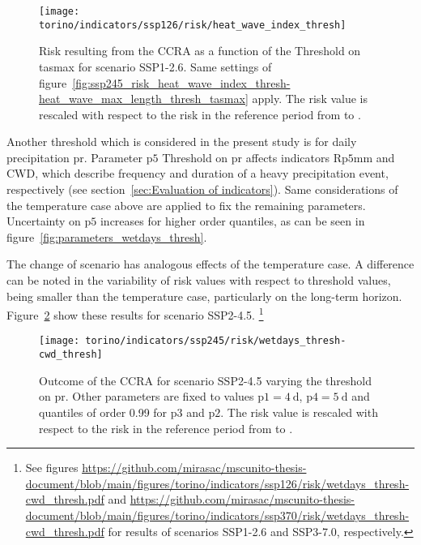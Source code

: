 \begin{figure}
  \centering
  \texttt{[image: torino/indicators/ssp126/risk/heat\_wave\_index\_thresh]}
  \caption{Risk resulting from the \gls{CCRA} as a function of the {Threshold on \gls{tasmax}} for scenario SSP1-2.6. Same settings of figure~\ref{fig:ssp245_risk_heat_wave_index_thresh-heat_wave_max_length_thresh_tasmax} apply. The risk value is rescaled with respect to the risk in the reference period from  to .}
  \label{fig:ssp126_risk_heat_wave_index_thresh-heat_wave_max_length_thresh_tasmax}
\end{figure}

Another threshold which is considered in the present study is for daily precipitation \gls{pr}. Parameter $\mathrm{p5}$ Threshold on \gls{pr} affects \glspl{indicator} $\mathrm{Rp5mm}$ and $\mathrm{CWD}$, which describe frequency and duration of a heavy precipitation event, respectively (see section~\ref{sec:Evaluation of indicators}). Same considerations of the temperature case above are applied to fix the remaining parameters. Uncertainty on $\mathrm{p5}$ increases for higher order quantiles, as can be seen in figure~\ref{fig:parameters_wetdays_thresh}.

The change of scenario has analogous effects of the temperature case. A difference can be noted in the variability of risk values with respect to threshold values, being smaller than the temperature case, particularly on the long-term horizon. Figure~\ref{fig:ssp245_risk_wetdays_thresh-cwd_thresh} show these results for scenario SSP2-4.5.%
\footnote{See figures \url{https://github.com/mirasac/mscunito-thesis-document/blob/main/figures/torino/indicators/ssp126/risk/wetdays_thresh-cwd_thresh.pdf} and \url{https://github.com/mirasac/mscunito-thesis-document/blob/main/figures/torino/indicators/ssp370/risk/wetdays_thresh-cwd_thresh.pdf} for results of scenarios SSP1-2.6 and SSP3-7.0, respectively.}

\begin{figure}
  \centering
  \texttt{[image: torino/indicators/ssp245/risk/wetdays\_thresh-cwd\_thresh]}
  \caption{Outcome of the \gls{CCRA} for scenario SSP2-4.5 varying the threshold on \gls{pr}. Other parameters are fixed to values $\mathrm{p1} = \qty{4}{\day}$, $\mathrm{p4} = \qty{5}{\day}$ and quantiles of order 0.99 for $\mathrm{p3}$ and $\mathrm{p2}$. The risk value is rescaled with respect to the risk in the reference period from  to .}
  \label{fig:ssp245_risk_wetdays_thresh-cwd_thresh}
\end{figure}



